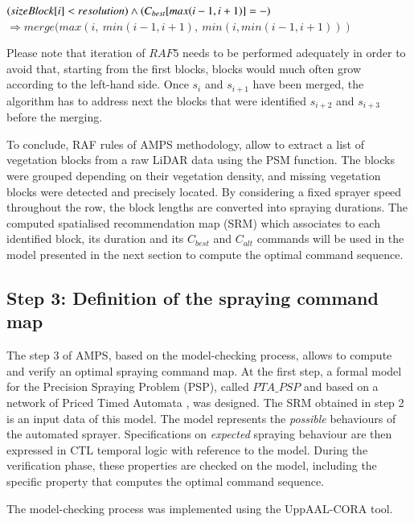 \documentclass[preprint,3p,times,twocolumn]{elsarticle}
\begin{document}
\begin{enumerate}
\begin{mdframed}
\end{mdframed}
\begin{mdframed}
	$   (sizeBlock[i] < resolution)  \wedge \\(C_{best} [max(i-1,i+1)] = -)  $
	$ \Rightarrow merge(max(i,\ min(i-1,i+1),\ min(i,min(i-1,i+1))
	)$
\end{mdframed}
Please note that iteration of $RAF5$ needs to be performed adequately in order to avoid that, starting from the first blocks, blocks would much often grow according to the left-hand side. Once $s_i$ and $s_{i+1}$ have been merged, the algorithm has to address next the blocks that were identified $s_{i+2}$ and $s_{i+3}$ before the merging. 

\end{enumerate}

To conclude, RAF rules of AMPS methodology, allow to extract a list of vegetation blocks from a raw LiDAR data using the PSM function. The blocks were grouped depending on their vegetation density, and missing vegetation blocks were detected and precisely located. By considering a fixed sprayer speed throughout the row, the block lengths are converted into spraying durations. The computed spatialised recommendation map (SRM) which associates to each identified block, its duration and its $C_{best}$ and $C_{alt}$ commands will be used in the model presented in the next section to compute the optimal command sequence.

\subsection{Step 3: Definition of the spraying command map}
\label{Verif}

The step 3 of AMPS, based on the model-checking process, allows to compute and verify an optimal spraying command map. At the first step, a formal model for the Precision Spraying Problem (PSP), called $PTA\_PSP$ and based on a network of Priced Timed Automata \cite{priced2004}, was designed. 
The SRM obtained in step 2 is an input data of this model. The model represents the \textit{possible} behaviours of the automated sprayer. Specifications on \textit{expected} spraying behaviour are then expressed in CTL temporal logic with reference to the model. During the verification phase, these properties are checked on the model, including the specific property that computes the optimal command sequence. 

The model-checking process was implemented using the UppAAL-CORA tool.   
\end{document}
